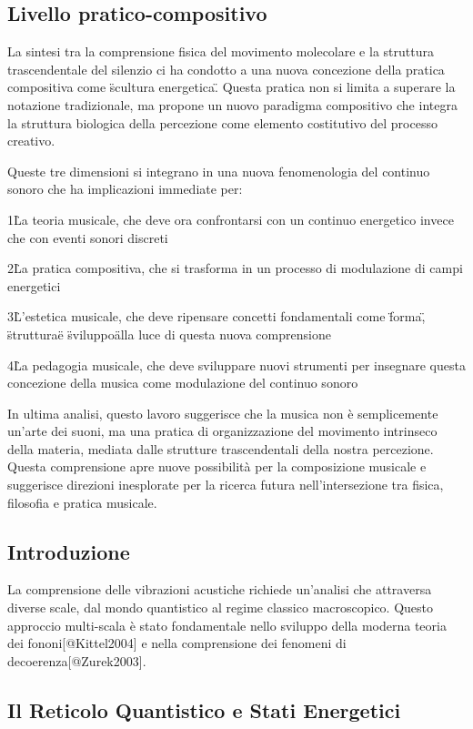 \documentclass[a4paper,11pt]{article}
\begin{document}
\subsection{Livello pratico-compositivo}

La sintesi tra la comprensione fisica del movimento molecolare e la
struttura trascendentale del silenzio ci ha condotto a una nuova
concezione della pratica compositiva come \"scultura energetica\".
Questa pratica non si limita a superare la notazione tradizionale, ma
propone un nuovo paradigma compositivo che integra la struttura
biologica della percezione come elemento costitutivo del processo
creativo.

Queste tre dimensioni si integrano in una nuova fenomenologia del
continuo sonoro che ha implicazioni immediate per:

1\. La teoria musicale, che deve ora confrontarsi con un continuo
energetico invece che con eventi sonori discreti

2\. La pratica compositiva, che si trasforma in un processo di
modulazione di campi energetici

3\. L'estetica musicale, che deve ripensare concetti fondamentali come
\"forma\", \"struttura\" e \"sviluppo\" alla luce di questa nuova
comprensione

4\. La pedagogia musicale, che deve sviluppare nuovi strumenti per
insegnare questa concezione della musica come modulazione del continuo
sonoro

In ultima analisi, questo lavoro suggerisce che la musica non è
semplicemente un'arte dei suoni, ma una pratica di organizzazione del
movimento intrinseco della materia, mediata dalle strutture
trascendentali della nostra percezione. Questa comprensione apre nuove
possibilità per la composizione musicale e suggerisce direzioni
inesplorate per la ricerca futura nell'intersezione tra fisica,
filosofia e pratica musicale.


\subsection{Introduzione}

La comprensione delle vibrazioni acustiche richiede un'analisi che
attraversa diverse scale, dal mondo quantistico al regime classico
macroscopico. Questo approccio multi-scala è stato fondamentale nello
sviluppo della moderna teoria dei fononi[@Kittel2004] e nella
comprensione dei fenomeni di decoerenza[@Zurek2003].

\subsection{Il Reticolo Quantistico e Stati Energetici}
\end{document}
